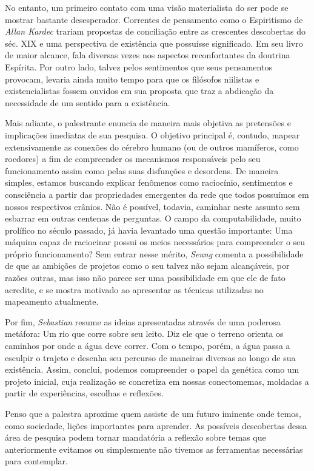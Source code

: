 \documentclass{homework}
\begin{document}
    \par
    No entanto, um primeiro contato com uma visão materialista do ser pode se mostrar bastante desesperador. Correntes de pensamento como o Espiritismo de \textit{Allan Kardec} trariam propostas de conciliação entre as crescentes descobertas do séc. XIX e uma perspectiva de existência que possuísse significado. Em seu livro de maior alcance, fala diversas vezes nos aspectos reconfortantes da doutrina Espírita. Por outro lado, talvez pelos sentimentos que seus pensamentos provocam, levaria ainda muito tempo para que os filósofos niilistas e existencialistas fossem ouvidos em sua proposta que traz a abdicação da necessidade de um sentido para a existência.%
	\par
	Mais adiante, o palestrante enuncia de maneira mais objetiva as pretensões e implicações imediatas de sua pesquisa. O objetivo principal é, contudo, mapear extensivamente as conexões do cérebro humano (ou de outros mamíferos, como roedores) a fim de compreender os mecanismos responsáveis pelo seu funcionamento assim como pelas suas disfunções e desordens. De maneira simples, estamos buscando explicar fenômenos como raciocínio, sentimentos e consciência a partir das propriedades emergentes da rede que todos possuímos em nossos respectivos crânios. Não é possível, todavia, caminhar neste assunto sem esbarrar em outras centenas de perguntas. O campo da computabilidade, muito prolífico no século passado, já havia levantado uma questão importante: Uma máquina capaz de raciocinar possui os meios necessários para compreender o seu próprio funcionamento? Sem entrar nesse mérito, \textit{Seung} comenta a possibilidade de que as ambições de projetos como o seu talvez não sejam alcançáveis, por razões outras, mas isso não parece ser uma possibilidade em que ele de fato acredite, e se mostra motivado ao apresentar as técnicas utilizadas no mapeamento atualmente.%
	\par
	Por fim, \textit{Sebastian} resume as ideias apresentadas através de uma poderosa metáfora: Um rio que corre sobre seu leito. Diz ele que o terreno orienta os caminhos por onde a água deve correr. Com o tempo, porém, a água passa a esculpir o trajeto e desenha seu percurso de maneiras diversas ao longo de sua existência. Assim, conclui, podemos compreender o papel da genética como um projeto inicial, cuja realização se concretiza em nossas conectomemas, moldadas a partir de experiências, escolhas e reflexões.%
	\par
	Penso que a palestra aproxime quem assiste de um futuro iminente onde temos, como sociedade, lições importantes para aprender. As possíveis descobertas dessa área de pesquisa podem tornar mandatória a reflexão sobre temas que anteriormente evitamos ou simplesmente não tivemos as ferramentas necessárias para contemplar. 
	 
\end{document}
